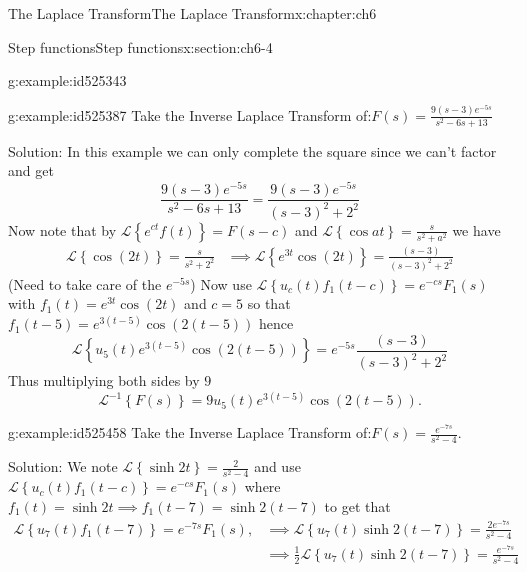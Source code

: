 \documentclass[oneside,10pt,]{book}
\numberwithin{equation}{section}
\numberwithin{equation}{section}
\newcommand{\amp}{&}
\begin{document}
\begin{chapterptx}{The Laplace Transform}{}{The Laplace Transform}{}{}{x:chapter:ch6}
\begin{sectionptx}{Step functions}{}{Step functions}{}{}{x:section:ch6-4}
\begin{example}{}{g:example:id525343}
\begin{equation*}
\end{equation*}
%
\end{example}
\begin{example}{}{g:example:id525387}%
Take the Inverse Laplace Transform of:\({\displaystyle F(s)=\frac{9\left(s-3\right)e^{-5s}}{s^{2}-6s+13}}\)%
\par
Solution: In this example we can only complete the square since we can't factor and get%
\begin{equation*}
\frac{9\left(s-3\right)e^{-5s}}{s^{2}-6s+13}=\frac{9\left(s-3\right)e^{-5s}}{\left(s-3\right)^{2}+2^{2}}
\end{equation*}
Now note that by \(\mathcal{L}\left\{ e^{ct}f\left(t\right)\right\} =F(s-c)\) and \(\mathcal{L}\left\{ \cos at\right\} =\frac{s}{s^{2}+a^{2}}\) we have%
\begin{align*}
\mathcal{L}\left\{ \cos\left(2t\right)\right\} =\frac{s}{s^{2}+2^{2}} \amp \implies\mathcal{L}\left\{ e^{3t}\cos\left(2t\right)\right\} =\frac{(s-3)}{(s-3)^{2}+2^{2}}
\end{align*}
(Need to take care of the \(e^{-5s}\)) Now use \(\mathcal{L}\left\{ u_{c}(t)f_{1}\left(t-c\right)\right\} =e^{-cs}F_{1}(s)\) with \(f_{1}(t)=e^{3t}\cos\left(2t\right)\) and \(c=5\) so that \(f_{1}(t-5)=e^{3(t-5)}\cos\left(2\left(t-5\right)\right)\) hence%
\begin{equation*}
\mathcal{L}\left\{ u_{5}(t)e^{3(t-5)}\cos\left(2\left(t-5\right)\right)\right\} =e^{-5s}\frac{(s-3)}{(s-3)^{2}+2^{2}}
\end{equation*}
Thus multiplying both sides by \(9\)%
\begin{equation*}
\mathcal{L}^{-1}\left\{ F(s)\right\} =9u_{5}(t)e^{3(t-5)}\cos\left(2\left(t-5\right)\right).
\end{equation*}
%
\end{example}
\begin{example}{}{g:example:id525458}%
Take the Inverse Laplace Transform of:\({\displaystyle F(s)=\frac{e^{-7s}}{s^{2}-4}}\).%
\par
Solution: We note \(\mathcal{L}\left\{ \sinh2t\right\} =\frac{2}{s^{2}-4}\) and use \(\mathcal{L}\left\{ u_{c}(t)f_{1}\left(t-c\right)\right\} =e^{-cs}F_{1}(s)\) where \(f_{1}(t)=\sinh2t\implies f_{1}(t-7)=\sinh2\left(t-7\right)\) to get that%
\begin{align*}
\mathcal{L}\left\{ u_{7}(t)f_{1}\left(t-7\right)\right\} =e^{-7s}F_{1}(s), \amp \implies\mathcal{L}\left\{ u_{7}(t)\sinh2\left(t-7\right)\right\} =\frac{2e^{-7s}}{s^{2}-4}\\
\amp \implies\frac{1}{2}\mathcal{L}\left\{ u_{7}(t)\sinh2\left(t-7\right)\right\} =\frac{e^{-7s}}{s^{2}-4}

\end{align*}
\end{example}
\end{sectionptx}
\end{chapterptx}
\end{document}
